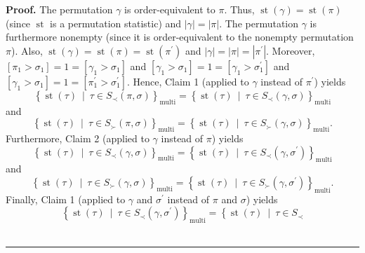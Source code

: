 \documentclass[numbers=enddot,12pt,final,onecolumn,notitlepage]{scrartcl}%
\theoremstyle{definition}
\newenvironment{proof}[1][Proof]{\noindent\textbf{#1.} }{\ \rule{0.5em}{0.5em}}
\begin{document}
\begin{proof}
The permutation $\gamma$ is order-equivalent to $\pi$. Thus,
$\operatorname*{st}\left(  \gamma\right)  =\operatorname*{st}\left(
\pi\right)  $ (since $\operatorname*{st}$ is a permutation statistic) and
$\left\vert \gamma\right\vert =\left\vert \pi\right\vert $. The permutation
$\gamma$ is furthermore nonempty (since it is order-equivalent to the nonempty
permutation $\pi$). Also, $\operatorname*{st}\left(  \gamma\right)
=\operatorname*{st}\left(  \pi\right)  =\operatorname*{st}\left(  \pi^{\prime
}\right)  $ and $\left\vert \gamma\right\vert =\left\vert \pi\right\vert
=\left\vert \pi^{\prime}\right\vert $. Moreover, $\left[  \pi_{1}>\sigma
_{1}\right]  =1=\left[  \gamma_{1}>\sigma_{1}\right]  $ and $\left[
\gamma_{1}>\sigma_{1}\right]  =1=\left[  \gamma_{1}>\sigma_{1}^{\prime
}\right]  $ and $\left[  \gamma_{1}>\sigma_{1}\right]  =1=\left[  \pi
_{1}^{\prime}>\sigma_{1}^{\prime}\right]  $. Hence, Claim 1 (applied to
$\gamma$ instead of $\pi^{\prime}$) yields%
\[
\left\{  \operatorname*{st}\left(  \tau\right)  \ \mid\ \tau\in S_{\prec
}\left(  \pi,\sigma\right)  \right\}  _{\operatorname*{multi}}=\left\{
\operatorname*{st}\left(  \tau\right)  \ \mid\ \tau\in S_{\prec}\left(
\gamma,\sigma\right)  \right\}  _{\operatorname*{multi}}%
\]
and%
\begin{equation}
\left\{  \operatorname*{st}\left(  \tau\right)  \ \mid\ \tau\in S_{\succ
}\left(  \pi,\sigma\right)  \right\}  _{\operatorname*{multi}}=\left\{
\operatorname*{st}\left(  \tau\right)  \ \mid\ \tau\in S_{\succ}\left(
\gamma,\sigma\right)  \right\}  _{\operatorname*{multi}}.\nonumber
\end{equation}
Furthermore, Claim 2 (applied to $\gamma$ instead of $\pi$) yields%
\[
\left\{  \operatorname*{st}\left(  \tau\right)  \ \mid\ \tau\in S_{\prec
}\left(  \gamma,\sigma\right)  \right\}  _{\operatorname*{multi}}=\left\{
\operatorname*{st}\left(  \tau\right)  \ \mid\ \tau\in S_{\prec}\left(
\gamma,\sigma^{\prime}\right)  \right\}  _{\operatorname*{multi}}%
\]
and%
\[
\left\{  \operatorname*{st}\left(  \tau\right)  \ \mid\ \tau\in S_{\succ
}\left(  \gamma,\sigma\right)  \right\}  _{\operatorname*{multi}}=\left\{
\operatorname*{st}\left(  \tau\right)  \ \mid\ \tau\in S_{\succ}\left(
\gamma,\sigma^{\prime}\right)  \right\}  _{\operatorname*{multi}}.
\]
Finally, Claim 1 (applied to $\gamma$ and $\sigma^{\prime}$ instead of $\pi$
and $\sigma$) yields%
\[
\left\{  \operatorname*{st}\left(  \tau\right)  \ \mid\ \tau\in S_{\prec
}\left(  \gamma,\sigma^{\prime}\right)  \right\}  _{\operatorname*{multi}%
}=\left\{  \operatorname*{st}\left(  \tau\right)  \ \mid\ \tau\in S_{\prec
}\]
\end{proof}
\end{document}
